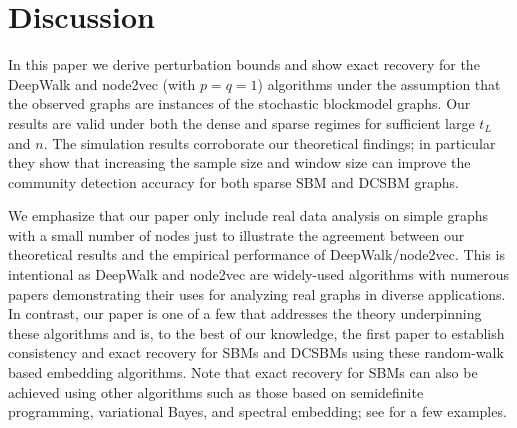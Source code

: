 \documentclass[10pt,journal,compsoc]{IEEEtran}
\newcommand{\bds}{\boldsymbol}
\newcommand{\T}{\top}
\def\T{{ \mathrm{\scriptscriptstyle T} }} %
\newcommand{\M}[1]{{{\mathbf{\MakeUppercase{#1}}}}}
\numberwithin{equation}{section}
\begin{document}
\section{Discussion}\label{sec:disc}
In this paper we derive perturbation bounds and show exact recovery for the DeepWalk and node2vec
(with $p = q = 1$) algorithms under the assumption that the observed graphs are instances
of the stochastic blockmodel graphs. Our results are valid under both the dense
and sparse regimes for sufficient large $t_L$ and $n$.
The simulation results corroborate our theoretical findings; 
in particular they show that increasing the sample size and window size
can improve the community detection accuracy for both sparse SBM and
DCSBM graphs. %

We emphasize that our paper only include real data analysis on simple graphs with a small number of nodes 
just to illustrate the agreement between our theoretical results and the empirical performance of DeepWalk/node2vec. This is intentional as DeepWalk
and node2vec are widely-used algorithms with numerous
papers demonstrating their uses for analyzing real
graphs in diverse applications. In contrast, our paper is one of a few
that addresses the theory underpinning these algorithms and is, to the best of our knowledge, the
first paper to establish consistency and exact recovery for SBMs and DCSBMs
using these random-walk based embedding algorithms. Note that exact recovery for SBMs can also be achieved using other algorithms such as those based on semidefinite programming, variational Bayes, and spectral embedding; see \cite{abbe2017community,gao_optimal,lyzinski2014perfect} for a few examples.  
\end{document}

